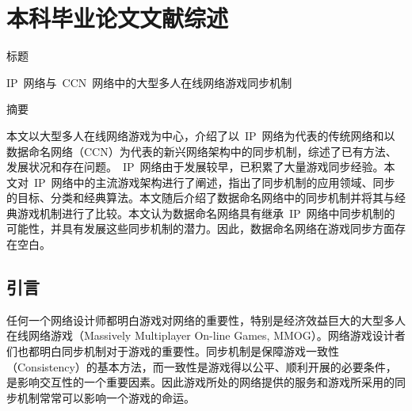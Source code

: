 \chapter{本科毕业论文文献综述}



%


\newcommand{\csa}{客户~\slash~服务器架构}
\newcommand{\pa}{对等体架构}
\newcommand{\da}{分布式架构}
\newcommand{\ma}{镜像服务器架构}
\newcommand{\ioc}{I{\slash}O\_C}
\newcommand{\gss}{GSS}
\newcommand{\timewarp}{时间弯曲算法}
\newcommand{\gvt}{GVT}


\heiti
标题

\songti
IP~网络与~CCN~网络中的大型多人在线网络游戏同步机制

\heiti
摘要

\songti
本文以大型多人在线网络游戏为中心，介绍了以~IP~网络为代表的传统网络和以数据命名网络（CCN）为代表的新兴网络架构中的同步机制，综述了已有方法、发展状况和存在问题。~IP~网络由于发展较早，已积累了大量游戏同步经验。本文对~IP~网络中的主流游戏架构进行了阐述，指出了同步机制的应用领域、同步的目标、分类和经典算法。本文随后介绍了数据命名网络中的同步机制并将其与经典游戏机制进行了比较。本文认为数据命名网络具有继承~IP~网络中同步机制的可能性，并具有发展这些同步机制的潜力。因此，数据命名网络在游戏同步方面存在空白。


\section{引言}
任何一个网络设计师都明白游戏对网络的重要性，特别是经济效益巨大的大型多人在线网络游戏（Massively Multiplayer On-line Games, MMOG）。网络游戏设计者们也都明白同步机制对于游戏的重要性。同步机制是保障游戏一致性（Consistency）的基本方法，而一致性是游戏得以公平、顺利开展的必要条件，是影响交互性的一个重要因素。因此游戏所处的网络提供的服务和游戏所采用的同步机制常常可以影响一个游戏的命运。

